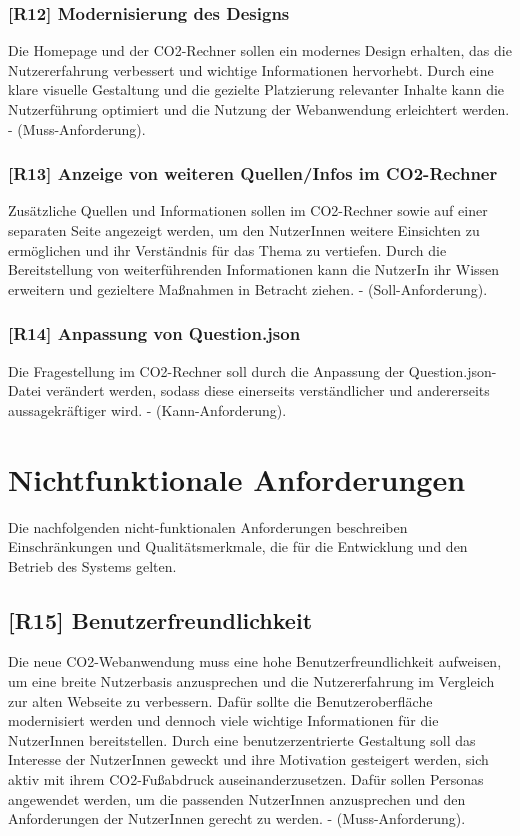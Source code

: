 \subsubsection{[R12] Modernisierung des Designs}

Die Homepage und der CO2-Rechner sollen ein modernes Design erhalten, das die Nutzererfahrung verbessert und wichtige Informationen hervorhebt. Durch eine klare visuelle Gestaltung und die gezielte Platzierung relevanter Inhalte kann die Nutzerführung optimiert und die Nutzung der Webanwendung erleichtert werden. - (Muss-Anforderung).

\subsubsection{[R13] Anzeige von weiteren Quellen/Infos im CO2-Rechner}

Zusätzliche Quellen und Informationen sollen im CO2-Rechner sowie auf einer separaten Seite angezeigt werden, um den NutzerInnen weitere Einsichten zu ermöglichen und ihr Verständnis für das Thema zu vertiefen. Durch die Bereitstellung von weiterführenden Informationen kann die NutzerIn ihr Wissen erweitern und gezieltere Maßnahmen in Betracht ziehen. - (Soll-Anforderung).

\subsubsection{[R14] Anpassung von Question.json}
\label{sec:questions-json-anpassen}

Die Fragestellung im CO2-Rechner soll durch die Anpassung der Question.json-Datei verändert werden, sodass diese einerseits verständlicher und andererseits aussagekräftiger wird. - (Kann-Anforderung).

\section{Nichtfunktionale Anforderungen}
\label{chapter:5-section:nichtfunktionale-anforderungen}

Die nachfolgenden nicht-funktionalen Anforderungen beschreiben Einschränkungen und Qualitätsmerkmale, die für die Entwicklung und den Betrieb des Systems gelten.

\subsection{[R15] Benutzerfreundlichkeit}

Die neue CO2-Webanwendung muss eine hohe Benutzerfreundlichkeit aufweisen, um eine breite Nutzerbasis anzusprechen und die Nutzererfahrung im Vergleich zur alten Webseite zu verbessern. Dafür sollte die Benutzeroberfläche modernisiert werden und dennoch viele wichtige Informationen für die NutzerInnen bereitstellen. Durch eine benutzerzentrierte Gestaltung soll das Interesse der NutzerInnen geweckt und ihre Motivation gesteigert werden, sich aktiv mit ihrem CO2-Fußabdruck auseinanderzusetzen. Dafür sollen Personas angewendet werden, um die passenden NutzerInnen anzusprechen und den Anforderungen der NutzerInnen gerecht zu werden. - (Muss-Anforderung).

